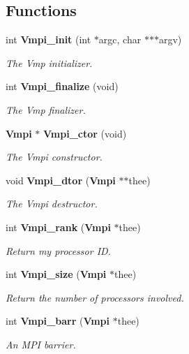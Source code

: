 \subsection*{Functions}
\begin{DoxyCompactItemize}
\item 
int {\bf Vmpi\_\-init} (int $\ast$argc, char $\ast$$\ast$$\ast$argv)
\begin{DoxyCompactList}\small\item\em The Vmp initializer. \item\end{DoxyCompactList}\item 
int {\bf Vmpi\_\-finalize} (void)
\begin{DoxyCompactList}\small\item\em The Vmp finalizer. \item\end{DoxyCompactList}\item 
{\bf Vmpi} $\ast$ {\bf Vmpi\_\-ctor} (void)
\begin{DoxyCompactList}\small\item\em The Vmpi constructor. \item\end{DoxyCompactList}\item 
void {\bf Vmpi\_\-dtor} ({\bf Vmpi} $\ast$$\ast$thee)
\begin{DoxyCompactList}\small\item\em The Vmpi destructor. \item\end{DoxyCompactList}\item 
int {\bf Vmpi\_\-rank} ({\bf Vmpi} $\ast$thee)
\begin{DoxyCompactList}\small\item\em Return my processor ID. \item\end{DoxyCompactList}\item 
int {\bf Vmpi\_\-size} ({\bf Vmpi} $\ast$thee)
\begin{DoxyCompactList}\small\item\em Return the number of processors involved. \item\end{DoxyCompactList}\item 
int {\bf Vmpi\_\-barr} ({\bf Vmpi} $\ast$thee)
\begin{DoxyCompactList}\small\item\em An MPI barrier. \item\end{DoxyCompactList}\item 
$$
\end{DoxyCompactItemize}
